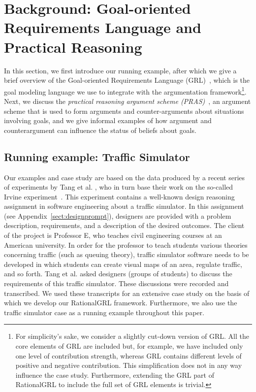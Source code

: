 \section{Background: Goal-oriented Requirements Language and Practical Reasoning}
\label{sect:background}

In this section, we first introduce our running example, after which we give a brief overview of the Goal-oriented Requirements Language (GRL)~\cite{Amyot:2010:EGM:1841349.1841356}, which is the goal modeling language we use to integrate with the argumentation framework\footnote{For simplicity's sake, we consider a slightly cut-down version of GRL. All the core elements of GRL are included but, for example, we have included only one level of contribution strength, whereas GRL contains different levels of positive and negative contribution. This simplification does not in any way influence the case study. Furthermore, extending the GRL part of RationalGRL to include the full set of GRL elements is trivial.}. Next, we discuss the \emph{practical reasoning argument scheme (PRAS)}~\cite{atkinson2007}, an argument scheme that is used to form arguments and counter-arguments about situations involving goals, and we give informal examples of how argument and counterargument can influence the status of beliefs about goals.   %

\subsection{Running example: Traffic Simulator}
\label{sect:goals:runningexample}

Our examples and case study are based on the data produced by a recent series of experiments by Tang et al. \cite{TangEtal2018}, who in turn base their work on the so-called Irvine experiment~\cite{UCIworkshop}. This experiment contains a well-known design reasoning assignment in software engineering about a traffic simulator. In this assignment (see Appendix~\ref{sect:designprompt}), designers are provided with a problem description, requirements, and a description of the desired outcomes. The client of the project is Professor E, who teaches civil engineering courses at an American university. In order for the professor to teach students various theories concerning traffic (such as queuing theory), traffic simulator software needs to be developed in which students can create visual maps of an area, regulate traffic, and so forth. Tang et al. asked designers (groups of students) to discuss the requirements of this traffic simulator. These discussions were recorded and transcribed. We used these transcripts for an extensive case study on the basis of which we develop our RationalGRL framework. Furthermore, we also use the traffic simulator case as a running example throughout this paper. 

